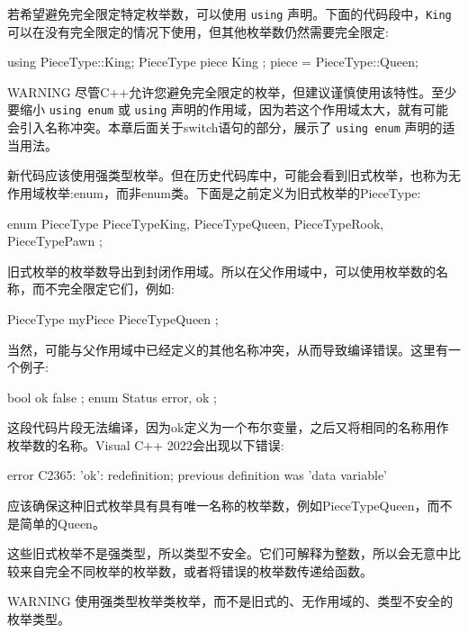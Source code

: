 若希望避免完全限定特定枚举数，可以使用 \verb|using| 声明。下面的代码段中，\verb|King| 可以在没有完全限定的情况下使用，但其他枚举数仍然需要完全限定:

\begin{cpp}
using PieceType::King;
PieceType piece { King };
piece = PieceType::Queen;
\end{cpp}

\begin{myWarning}{WARNING}
尽管C++允许您避免完全限定的枚举，但建议谨慎使用该特性。至少要缩小 \verb|using enum| 或 \verb|using| 声明的作用域，因为若这个作用域太大，就有可能会引入名称冲突。本章后面关于switch语句的部分，展示了 \verb|using enum| 声明的适当用法。
\end{myWarning}


新代码应该使用强类型枚举。但在历史代码库中，可能会看到旧式枚举，也称为无作用域枚举:enum，而非enum类。下面是之前定义为旧式枚举的PieceType:

\begin{cpp}
enum PieceType { PieceTypeKing, PieceTypeQueen, PieceTypeRook, PieceTypePawn };
\end{cpp}

旧式枚举的枚举数导出到封闭作用域。所以在父作用域中，可以使用枚举数的名称，而不完全限定它们，例如:

\begin{cpp}
PieceType myPiece { PieceTypeQueen };
\end{cpp}

当然，可能与父作用域中已经定义的其他名称冲突，从而导致编译错误。这里有一个例子:

\begin{cpp}
bool ok { false };
enum Status { error, ok };
\end{cpp}

这段代码片段无法编译，因为ok定义为一个布尔变量，之后又将相同的名称用作枚举数的名称。Visual C++ 2022会出现以下错误:

\begin{shell}
error C2365: 'ok': redefinition; previous definition was 'data variable'
\end{shell}

应该确保这种旧式枚举具有具有唯一名称的枚举数，例如PieceTypeQueen，而不是简单的Queen。

这些旧式枚举不是强类型，所以类型不安全。它们可解释为整数，所以会无意中比较来自完全不同枚举的枚举数，或者将错误的枚举数传递给函数。

\begin{myWarning}{WARNING}
使用强类型枚举类枚举，而不是旧式的、无作用域的、类型不安全的枚举类型。
\end{myWarning}

